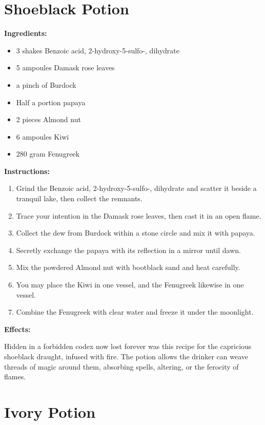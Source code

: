 \documentclass{article}
\begin{document}
\newpage
\section*{Shoeblack Potion}

\textbf{Ingredients:}

\begin{itemize}
  \item 3 shakes Benzoic acid, 2-hydroxy-5-sulfo-, dihydrate
  \item 5 ampoules Damask rose leaves
  \item a pinch of Burdock
  \item Half a portion papaya
  \item 2 pieces Almond nut
  \item 6 ampoules Kiwi
  \item 280 gram Fenugreek
\end{itemize}

\textbf{Instructions:}

\begin{enumerate}
  \item Grind the Benzoic acid, 2-hydroxy-5-sulfo-, dihydrate and scatter it beside a tranquil lake, then collect the remnants.
  \item Trace your intention in the Damask rose leaves, then cast it in an open flame.
  \item Collect the dew from Burdock within a stone circle and mix it with papaya.
  \item Secretly exchange the papaya with its reflection in a mirror until dawn.
  \item Mix the powdered Almond nut with bootblack sand and heat carefully.
  \item You may place the Kiwi in one vessel, and the Fenugreek likewise in one vessel.
  \item Combine the Fenugreek with clear water and freeze it under the moonlight.
\end{enumerate}

\textbf{Effects:}

Hidden in a forbidden codex now lost forever was this recipe for the capricious shoeblack draught, infused with fire. The potion allows the drinker can weave threads of magic around them, absorbing spells, altering, or the ferocity of flames.

\newpage
\section*{Ivory Potion}
\end{document}

